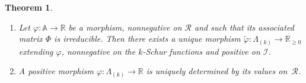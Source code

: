 \documentclass[10pt,a4paper]{amsart}
\newtheorem{theorem}{Theorem}[section]
\theoremstyle{definition}
\begin{document}
\begin{theorem}
\label{principalDomain} \ 

\begin{enumerate}
\item\label{theo5.1_1} Let $\varphi:\mathbb{A}\rightarrow\mathbb{R}$ be a morphism, nonnegative
on $\mathcal{R}$ and such that its associated matrix $\Phi$ is irreducible.
Then there exists a unique morphism $\tilde{\varphi}:\Lambda_{(k)}%
\longrightarrow\mathbb{R}_{\geq0}$ extending $\varphi$, nonnegative on the
$k$-Schur functions and positive on $\mathcal{I}$.

\item\label{theo5.1_2} A positive morphism $\varphi:\Lambda_{(k)}\longrightarrow\mathbb{R}$ is
uniquely determined by its values on~$\mathcal{R}$.
\end{enumerate}
\end{theorem}
\end{document}
